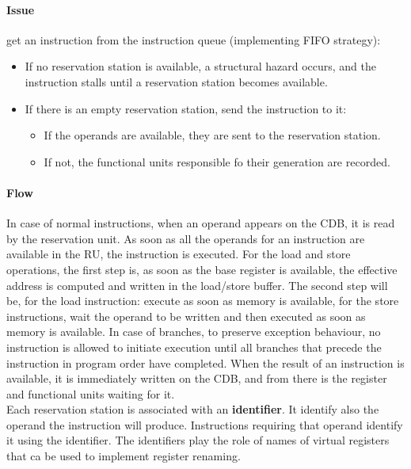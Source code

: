 \documentclass[12pt]{article}
\begin{document}
\paragraph{Issue} get an instruction from the instruction queue (implementing FIFO strategy):
\begin{itemize}
  \item If no reservation station is available, a structural hazard occurs, and the instruction stalls until a reservation station becomes available.
  \item If there is an empty reservation station, send the instruction to it:
  \begin{itemize}
    \item If the operands are available, they are sent to the reservation station.
    \item If not, the functional units responsible fo their generation are recorded.
  \end{itemize}
\end{itemize}

\paragraph{Flow} In case of normal instructions, when an operand appears on the CDB, it is read by the reservation unit. As soon as all the operands for an instruction are available in the RU, the instruction is executed. For the load and store operations, the first step is, as soon as the base register is available, the effective address is computed and written in the load/store buffer. The second step will be, for the load instruction: execute as soon as memory is available, for the store instructions, wait the operand to be written and then executed as soon as memory is available. In case of branches, to preserve exception behaviour, no instruction is allowed to initiate execution until all branches that precede the instruction in program order have completed. When the result of an instruction is available, it is immediately written on the CDB, and from there is the register and functional units waiting for it.\\

Each reservation station is associated with an \textbf{identifier}. It identify also the operand the instruction will produce. Instructions requiring that operand identify it using the identifier. The identifiers play the role of names of virtual registers that ca be used to implement register renaming.
\end{document}
